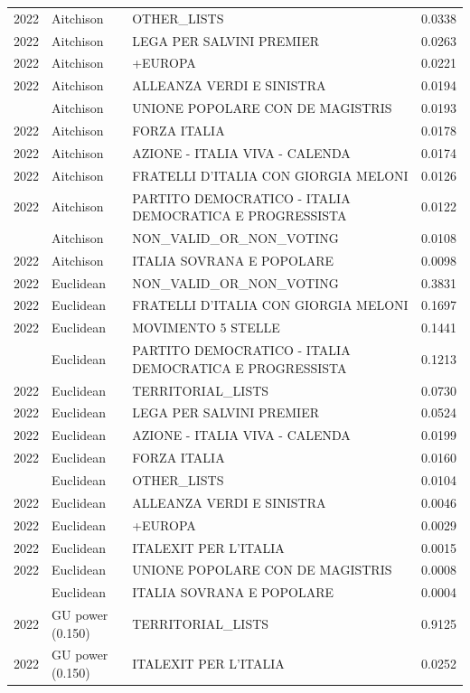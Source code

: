 \begin{longtable}[t]{rllr}
2022 & Aitchison & OTHER\_LISTS & 0.0338\\
2022 & Aitchison & LEGA PER SALVINI PREMIER & 0.0263\\
2022 & Aitchison & +EUROPA & 0.0221\\
2022 & Aitchison & ALLEANZA VERDI E SINISTRA & 0.0194\\
\addlinespace
2022 & Aitchison & UNIONE POPOLARE CON DE MAGISTRIS & 0.0193\\
2022 & Aitchison & FORZA ITALIA & 0.0178\\
2022 & Aitchison & AZIONE - ITALIA VIVA - CALENDA & 0.0174\\
2022 & Aitchison & FRATELLI D'ITALIA CON GIORGIA MELONI & 0.0126\\
2022 & Aitchison & PARTITO DEMOCRATICO - ITALIA DEMOCRATICA E PROGRESSISTA & 0.0122\\
\addlinespace
2022 & Aitchison & NON\_VALID\_OR\_NON\_VOTING & 0.0108\\
2022 & Aitchison & ITALIA SOVRANA E POPOLARE & 0.0098\\
2022 & Euclidean & NON\_VALID\_OR\_NON\_VOTING & 0.3831\\
2022 & Euclidean & FRATELLI D'ITALIA CON GIORGIA MELONI & 0.1697\\
2022 & Euclidean & MOVIMENTO 5 STELLE & 0.1441\\
\addlinespace
2022 & Euclidean & PARTITO DEMOCRATICO - ITALIA DEMOCRATICA E PROGRESSISTA & 0.1213\\
2022 & Euclidean & TERRITORIAL\_LISTS & 0.0730\\
2022 & Euclidean & LEGA PER SALVINI PREMIER & 0.0524\\
2022 & Euclidean & AZIONE - ITALIA VIVA - CALENDA & 0.0199\\
2022 & Euclidean & FORZA ITALIA & 0.0160\\
\addlinespace
2022 & Euclidean & OTHER\_LISTS & 0.0104\\
2022 & Euclidean & ALLEANZA VERDI E SINISTRA & 0.0046\\
2022 & Euclidean & +EUROPA & 0.0029\\
2022 & Euclidean & ITALEXIT PER L'ITALIA & 0.0015\\
2022 & Euclidean & UNIONE POPOLARE CON DE MAGISTRIS & 0.0008\\
\addlinespace
2022 & Euclidean & ITALIA SOVRANA E POPOLARE & 0.0004\\
2022 & GU power (0.150) & TERRITORIAL\_LISTS & 0.9125\\
2022 & GU power (0.150) & ITALEXIT PER L'ITALIA & 0.0252\\

\end{longtable}
